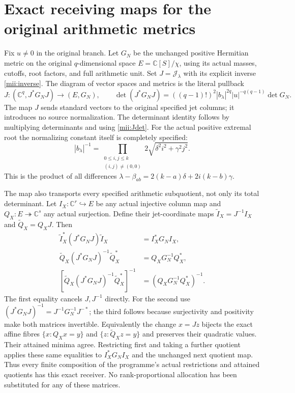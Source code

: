 \documentclass[11pt]{article}
\newcommand{\CC}{\mathbb C}
\begin{document}
\section{Exact receiving maps for the original arithmetic metrics}
Fix $u\ne0$ in the original branch. Let $G_N$ be the unchanged
positive Hermitian metric on the original $q$-dimensional space
$E=\CC[S]/\chi$, using its actual masses, cutoffs, root factors,
and full arithmetic unit. Set $J=\mathcal J_\lambda$ with its
explicit inverse \eqref{mii:inverse}. The diagram of vector
spaces and metrics is the literal pullback
\begin{equation}\tag{MII31}\label{mii:gram}
 J:(\CC^q,J^*G_NJ)\longrightarrow(E,G_N),\qquad
 \det(J^*G_NJ)=((q-1)!)^2|b_\lambda|^{2q}
                       |u|^{-q(q-1)}\det G_N.
\end{equation}
The map $J$ sends standard vectors to the original specified
jet columns; it introduces no source normalization. The determinant
identity follows by multiplying determinants and using
\eqref{mii:Jdet}. For the actual positive extremal root the
normalizing constant itself is completely specified:
\begin{equation}\tag{MII32}\label{mii:rootproduct}
 |b_\lambda|^{-1}
  =\prod_{\substack{0\le i,j\le k\\(i,j)\ne(0,0)}}
                   2\sqrt{\delta^2 i^2+\gamma^2j^2}.
\end{equation}
This is the product of all differences
$\lambda-\beta_{ab}=2(k-a)\delta+2i(k-b)\gamma$.

The map also transports every specified arithmetic subquotient,
not only its total determinant. Let $I_X:\CC^r\hookrightarrow E$
be any actual injective column map and $Q_X:E\twoheadrightarrow
\CC^s$ any actual surjection. Define their jet-coordinate maps
$\widetilde I_X=J^{-1}I_X$ and $\widetilde Q_X=Q_XJ$.
Then
\begin{equation}\tag{MII33}\label{mii:restrictions}
 \begin{aligned}
 \widetilde I_X^*(J^*G_NJ)\widetilde I_X&=I_X^*G_NI_X,\\
 \widetilde Q_X(J^*G_NJ)^{-1}\widetilde Q_X^*
                         &=Q_XG_N^{-1}Q_X^*,\\
 \left[\widetilde Q_X(J^*G_NJ)^{-1}\widetilde Q_X^*\right]^{-1}
                         &=(Q_XG_N^{-1}Q_X^*)^{-1}.
 \end{aligned}
\end{equation}
The first equality cancels $J,J^{-1}$ directly. For the second
use $(J^*G_NJ)^{-1}=J^{-1}G_N^{-1}J^{-*}$; the third follows
because surjectivity and positivity make both matrices invertible.
Equivalently the change $x=Jz$ bijects the exact affine fibres
$\{x:Q_Xx=y\}$ and $\{z:\widetilde Q_Xz=y\}$ and preserves their
quadratic values. Their attained minima agree. Restricting first
and taking a further quotient applies these same equalities to
$I_X^*G_NI_X$ and the unchanged next quotient map. Thus every
finite composition of the programme's actual restrictions and
attained quotients has this exact receiver. No rank-proportional
allocation has been substituted for any of these matrices.
\end{document}
